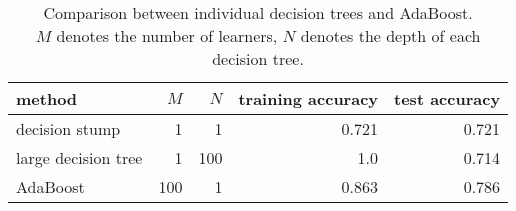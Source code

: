 \begin{table}[htbp]
    \centering
    \begin{tabular}{lrrrr}
    \toprule
    method & $M$ & $N$ & training accuracy & test accuracy \\
    \midrule
    decision stump          & 1     & 1     & 0.721      & 0.721 \\
    large decision tree     & 1     & 100   & 1.0       & 0.714 \\
    AdaBoost           & 100   & 1     & 0.863      & 0.786 \\
    \bottomrule
    \end{tabular}
    \caption{Comparison between individual decision trees and AdaBoost.\\$M$ denotes the number of learners, $N$ denotes the depth of each decision tree.}
    \label{tab:adaboost}
\end{table}